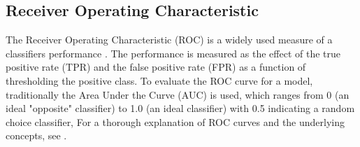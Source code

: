 \subsection{Receiver Operating Characteristic}
The Receiver Operating Characteristic (ROC) is a widely used measure of a
classifiers performance . The performance is measured as the effect
of the true positive rate (TPR) and the false positive rate (FPR) as a function
of thresholding the positive class. To evaluate the ROC curve for a model,
traditionally the Area Under the Curve (AUC) is used, which ranges from 0
(an ideal "opposite" classifier) to 1.0 (an ideal classifier) with 0.5
indicating a random choice classifier,
For a thorough explanation of ROC curves and the underlying concepts, see \cite{Fawcett2006}.
